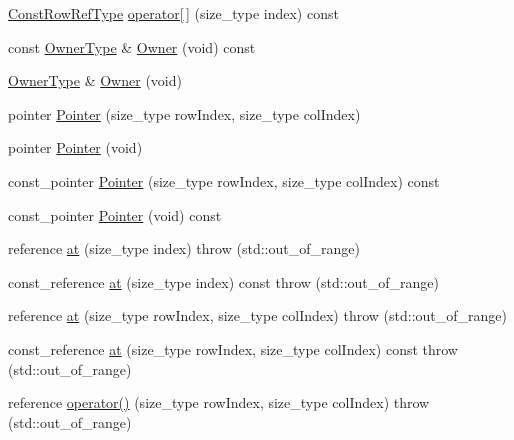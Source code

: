 \begin{DoxyCompactItemize}
\item 
\hyperlink{classvct_dynamic_const_matrix_base_a42a300cb1afd5f0602ba5c2d7d9cc40b}{Const\+Row\+Ref\+Type} \hyperlink{classvct_dynamic_matrix_base_a60b354a884612e88784b54711c24604a}{operator\mbox{[}$\,$\mbox{]}} (size\+\_\+type index) const 
\item 
const \hyperlink{classvct_dynamic_const_matrix_base_a2e37ebc2ac741d4346d21f986e625e96}{Owner\+Type} \& \hyperlink{classvct_dynamic_matrix_base_af1e62c6df98a585144c000628bc2712b}{Owner} (void) const 
\item 
\hyperlink{classvct_dynamic_const_matrix_base_a2e37ebc2ac741d4346d21f986e625e96}{Owner\+Type} \& \hyperlink{classvct_dynamic_matrix_base_ad17391454ad7a4188e1ed067dc1c6d46}{Owner} (void)
\item 
pointer \hyperlink{classvct_dynamic_matrix_base_a1640cc52014d5676f509d2f9e72f7803}{Pointer} (size\+\_\+type row\+Index, size\+\_\+type col\+Index)
\item 
pointer \hyperlink{classvct_dynamic_matrix_base_a631904190680ef5d6944cda3b5f86fa8}{Pointer} (void)
\item 
const\+\_\+pointer \hyperlink{classvct_dynamic_matrix_base_a72cb3bdb402b840ddd664a59b77033e3}{Pointer} (size\+\_\+type row\+Index, size\+\_\+type col\+Index) const 
\item 
const\+\_\+pointer \hyperlink{classvct_dynamic_matrix_base_afd1f6495ccd2c9c5557a3f941a7a552d}{Pointer} (void) const 
\item 
reference \hyperlink{classvct_dynamic_matrix_base_a51b8ffe675d3810b96ecc0820f3936e9}{at} (size\+\_\+type index)  throw (std\+::out\+\_\+of\+\_\+range)
\item 
const\+\_\+reference \hyperlink{classvct_dynamic_matrix_base_a84523d1dd74aa7dbbb3f4fa498f541ac}{at} (size\+\_\+type index) const   throw (std\+::out\+\_\+of\+\_\+range)
\item 
reference \hyperlink{classvct_dynamic_matrix_base_a7c4ba3b87d2aa03795285dd216c1f573}{at} (size\+\_\+type row\+Index, size\+\_\+type col\+Index)  throw (std\+::out\+\_\+of\+\_\+range)
\item 
const\+\_\+reference \hyperlink{classvct_dynamic_matrix_base_ae665610f77ec304ea0d9757a42926a49}{at} (size\+\_\+type row\+Index, size\+\_\+type col\+Index) const   throw (std\+::out\+\_\+of\+\_\+range)
\item 
reference \hyperlink{classvct_dynamic_matrix_base_a3862bb256a94ea9a61eadd16b24a4fc8}{operator()} (size\+\_\+type row\+Index, size\+\_\+type col\+Index)  throw (std\+::out\+\_\+of\+\_\+range)

\end{DoxyCompactItemize}
